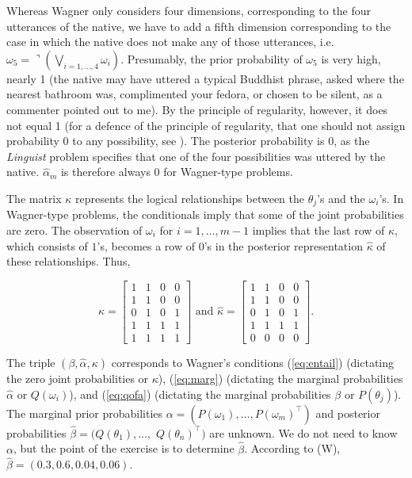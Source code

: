 Whereas Wagner only considers four dimensions, corresponding to the
four utterances of the native, we have to add a fifth dimension
corresponding to the case in which the native does not make any of
those utterances, i.e.\
$\omega_{5}=\urcorner(\bigvee_{i=1,\ldots,4}\omega_{i})$. Presumably,
the prior probability of $\omega_{5}$ is very high, nearly 1 (the
native may have uttered a typical Buddhist phrase, asked where the
nearest bathroom was, complimented your fedora, or chosen to be
silent, as a commenter pointed out to me). By the principle of
regularity, however, it does not equal 1 (for a defence of the
principle of regularity, that one should not assign probability 0 to
any possibility, see \scite{7}{edwardsetal63}{}). The posterior
probability is $0$, as the \emph{Linguist} problem specifies that one
of the four possibilities was uttered by the native.
$\hat{\alpha}_{m}$ is therefore always $0$ for Wagner-type problems.

The matrix $\kappa$ represents the logical relationships between the
$\theta_{j}$'s and the $\omega_{i}$'s. In Wagner-type problems, the
conditionals imply that some of the joint probabilities are zero. The
observation of $\omega_{i}$ for $i=1,\ldots,m-1$ implies that the last
row of $\kappa$, which consists of $1$'s, becomes a row of $0$'s in
the posterior representation $\hat{\kappa}$ of these relationships.
Thus,

\begin{equation}
  \label{eq:p3}
  \kappa=\left[
  \begin{array}{cccc}
    1 & 1 & 0 & 0 \\
    1 & 1 & 0 & 0 \\
    0 & 1 & 0 & 1 \\
    1 & 1 & 1 & 1 \\
    1 & 1 & 1 & 1
  \end{array}
\right]\mbox{ and }
  \hat{\kappa}=\left[
  \begin{array}{cccc}
    1 & 1 & 0 & 0 \\
    1 & 1 & 0 & 0 \\
    0 & 1 & 0 & 1 \\
    1 & 1 & 1 & 1 \\
    0 & 0 & 0 & 0
  \end{array}
\right].
\end{equation}

The triple $(\beta,\hat{\alpha},\kappa)$ corresponds to Wagner's
conditions (\ref{eq:entail}) (dictating the zero joint probabilities
or $\kappa$), (\ref{eq:marg}) (dictating the marginal probabilities
$\hat{\alpha}$ or $Q(\omega_{i})$), and (\ref{eq:qofa}) (dictating the
marginal probabilities $\beta$ or $P(\theta_{j})$). The marginal prior
probabilities
$\alpha=(P(\omega_{1}),\ldots,P(\omega_{m})^{\intercal})$ and
posterior probabilities $\hat{\beta}=(Q(\theta_{1}),\ldots,$
$Q(\theta_{n})^{\intercal})$ are unknown. We do not need to know
$\alpha$, but the point of the exercise is to determine $\hat{\beta}$.
According to (W), $\hat{\beta}=(0.3,0.6,0.04,0.06)$.

